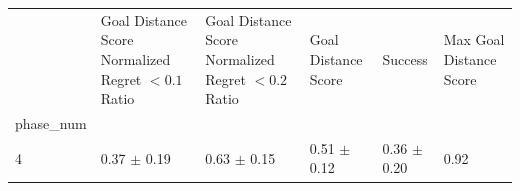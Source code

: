\begin{tabular}{llllll}
\toprule
 & Goal Distance Score Normalized Regret $< 0.1$ Ratio & Goal Distance Score Normalized Regret $< 0.2$ Ratio & Goal Distance Score & Success & Max Goal Distance Score \\
phase_num &  &  &  &  &  \\
\midrule
4 & 0.37 $\pm$ 0.19 & 0.63 $\pm$ 0.15 & 0.51 $\pm$ 0.12 & 0.36 $\pm$ 0.20 & 0.92 \\
\bottomrule
\end{tabular}
